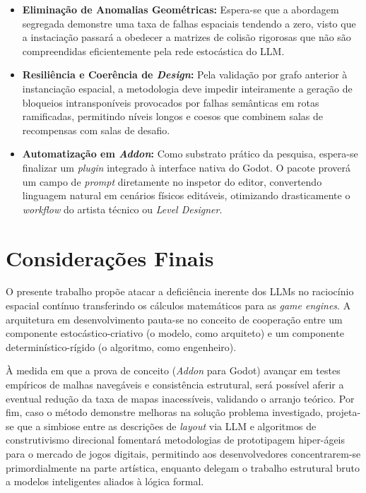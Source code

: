 \documentclass[
  12pt,
  a4paper,
  oneside,
  article,
  brazil
]{abntex2}
\begin{document}
\begin{itemize}[leftmargin=*]
    \item \textbf{Eliminação de Anomalias Geométricas:} Espera-se que a abordagem segregada demonstre uma taxa de falhas espaciais tendendo a zero, visto que a instaciação passará a obedecer a matrizes de colisão rigorosas que não são compreendidas eficientemente pela rede estocástica do LLM.
    \item \textbf{Resiliência e Coerência de \textit{Design}:} Pela validação por grafo anterior à instanciação espacial, a metodologia deve impedir inteiramente a geração de bloqueios intransponíveis provocados por falhas semânticas em rotas ramificadas, permitindo níveis longos e coesos que combinem salas de recompensas com salas de desafio.
    \item \textbf{Automatização em \textit{Addon}:} Como substrato prático da pesquisa, espera-se finalizar um \textit{plugin} integrado à interface nativa do Godot. O pacote proverá um campo de \textit{prompt} diretamente no inspetor do editor, convertendo linguagem natural em cenários físicos editáveis, otimizando drasticamente o \textit{workflow} do artista técnico ou \textit{Level Designer}.
\end{itemize}

\section{Considerações Finais}

O presente trabalho propõe atacar a deficiência inerente dos LLMs no raciocínio espacial contínuo transferindo os cálculos matemáticos para as \textit{game engines}. A arquitetura em desenvolvimento pauta-se no conceito de cooperação entre um componente estocástico-criativo (o modelo, como arquiteto) e um componente determinístico-rígido (o algoritmo, como engenheiro). 

À medida em que a prova de conceito (\textit{Addon} para Godot) avançar em testes empíricos de malhas navegáveis e consistência estrutural, será possível aferir a eventual redução da taxa de mapas inacessíveis, validando o arranjo teórico. Por fim, caso o método demonstre melhoras na solução problema investigado, projeta-se que a simbiose entre as descrições de \textit{layout} via LLM e algoritmos de construtivismo direcional fomentará metodologias de prototipagem hiper-ágeis para o mercado de jogos digitais, permitindo aos desenvolvedores concentrarem-se primordialmente na parte artística, enquanto delegam o trabalho estrutural bruto a modelos inteligentes aliados à lógica formal.

\SingleSpacing
\printbibliography[title={Referências}]
\end{document}
